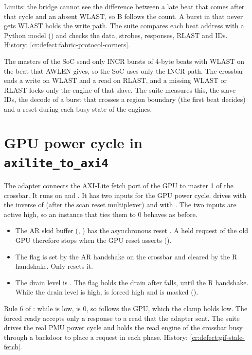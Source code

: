 Limits: the bridge cannot see the difference between a late beat that comes after that cycle and an absent WLAST, so B follows the count. A burst in  that never gets WLAST holds the write path. The suite  compares each beat address with a Python model () and checks the data, strobes, responses, RLAST and IDs. History: \cref{cr:defect:fabric-protocol-corners}.

The masters of the SoC send only INCR bursts of 4-byte beats with WLAST on the beat that AWLEN gives, so the SoC uses only the INCR path. The crossbar ends a write on WLAST and a read on RLAST, and a missing WLAST or RLAST locks only the engine of that slave. The suite  measures this, the slave IDs, the decode of a burst that crosses a region boundary (the first beat decides) and a reset during each busy state of the engines.

\section{GPU power cycle in \texttt{axilite\_to\_axi4}}\label{tm:mod:axilite-to-axi4-power-cycle}
The adapter  connects the AXI-Lite fetch port of the GPU to master 1 of the crossbar. It runs on  and . It has two inputs for the GPU power cycle.  drives  with the inverse of  (after the scan reset multiplexer) and  with . The two inputs are active high, so an instance that ties them to 0 behaves as before.
\begin{itemize}
  \item The AR skid buffer (, ) has the asynchronous reset . A held request of the old GPU therefore stops when the GPU reset asserts ().
  \item The flag  is set by the AR handshake on the crossbar and cleared by the R handshake. Only  resets it.
  \item The drain level is . The flag  holds the drain after  falls, until the R handshake. While the drain level is high,  is forced high and  is masked ().
\end{itemize}
Rule 6 of : while  is low,  is 0, so  follows the GPU, which the clamp holds low. The forced ready accepts only a response to a read that the adapter sent. The suite  drives the real PMU power cycle and holds the read engine of the crossbar busy through a backdoor to place a request in each phase. History: \cref{cr:defect:gif-stale-fetch}.

